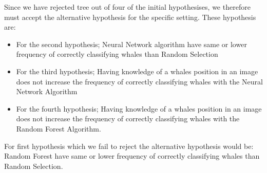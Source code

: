 Since we have rejected tree out of four of the initial hypothesises, we therefore must accept the alternative hypothesis for the specific setting.
These hypothesis are:
\begin{itemize}
\item For the second hypothesis; Neural Network algorithm have same or lower frequency of correctly classifying whales than Random Selection
\item For the third hypothesis; Having knowledge of a whales position in an image does not increase the frequency of correctly classifying whales with the Neural Network Algorithm
\item For the fourth hypothesis; Having knowledge of a whales position in an image does not increase the frequency of correctly classifying whales with the Random Forest Algorithm.  
\end{itemize}

For first hypothesis which we fail to reject the alternative hypothesis would be:
Random Forest have same or lower frequency of correctly classifying whales than Random Selection.